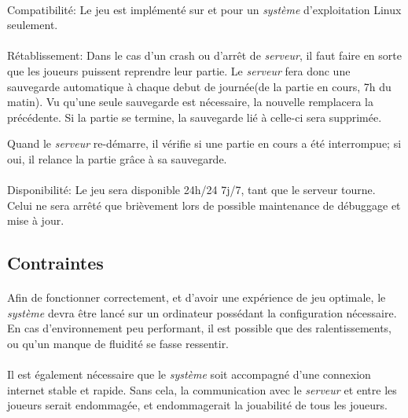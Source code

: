 \documentclass[a4paper,11pt]{report}
\begin{document}
\paragraph{}Compatibilité:  \newline
Le jeu est implémenté sur et pour un \textit{système} d'exploitation Linux seulement.

\paragraph{}Rétablissement:  \newline
Dans le cas d'un crash ou d'arrêt de \textit{serveur}, il faut faire en sorte que les joueurs puissent reprendre leur partie. Le \textit{serveur} fera donc une sauvegarde automatique à chaque debut de journée(de la partie en cours, 7h du matin). 
Vu qu'une seule sauvegarde est nécessaire, la nouvelle remplacera la précédente.
Si la partie se termine, la sauvegarde lié à celle-ci sera supprimée.

Quand le \textit{serveur} re-démarre, il vérifie si une partie en cours a été interrompue; si oui, il relance la partie grâce à sa sauvegarde.

\paragraph{}Disponibilité:  \newline
Le jeu sera disponible 24h/24 7j/7, tant que le serveur tourne. Celui ne sera arrêté que brièvement lors de possible maintenance de débuggage et mise à jour.

\subsection{Contraintes}
\paragraph{}
Afin de fonctionner correctement, et d’avoir une expérience de jeu optimale, le \textit{système} devra être lancé sur un ordinateur possédant la configuration nécessaire.
En cas d’environnement peu performant, il est possible que des ralentissements, ou qu’un manque de fluidité se fasse ressentir.
\paragraph{}
Il est également nécessaire que le \textit{système} soit accompagné d’une connexion internet stable et rapide.
Sans cela, la communication avec le \textit{serveur} et entre les joueurs serait endommagée, et endommagerait la jouabilité de tous les joueurs.
\end{document}
